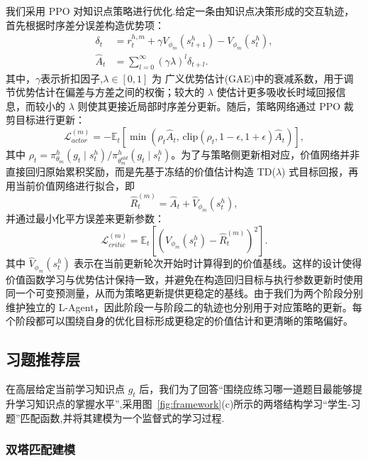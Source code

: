\documentclass[11pt,a4paper]{article}
\begin{document}
我们采用 PPO 对知识点策略进行优化.给定一条由知识点决策形成的交互轨迹，首先根据时序差分误差构造优势项：
\begin{equation}
\begin{aligned}
\delta_t &= r_t^{h,m}+\gamma V_{\phi_m}(s_{t+1}^h)-V_{\phi_m}(s_t^h),\\
\hat{A}_t &= \sum_{l=0}^{\infty}(\gamma\lambda)^l\delta_{t+l}.
\end{aligned}
\end{equation}
其中，$\gamma$表示折扣因子,$\lambda\in[0,1]$ 为 广义优势估计(GAE)中的衰减系数，用于调节优势估计在偏差与方差之间的权衡；较大的 $\lambda$ 使估计更多吸收长时域回报信息，而较小的 $\lambda$ 则使其更接近局部时序差分更新。随后，策略网络通过 PPO 裁剪目标进行更新：
\begin{equation}
\mathcal{L}_{actor}^{(m)}
=
-\mathbb{E}_t
\left[
\min\left(
\rho_t\hat{A}_t,\,
\mathrm{clip}(\rho_t,1-\epsilon,1+\epsilon)\hat{A}_t
\right)
\right],
\end{equation}
其中 $\rho_t=\pi_{\theta_m}^h(g_t\mid s_t^h)/\pi_{\theta_m^{old}}^h(g_t\mid s_t^h)$。为了与策略侧更新相对应，价值网络并非直接回归原始累积奖励，而是先基于冻结的价值估计构造 TD($\lambda$) 式目标回报，再用当前价值网络进行拟合，即
\begin{equation}
\hat{R}_t^{(m)}=\hat{A}_t+\hat{V}_{\phi_m}(s_t^h),
\end{equation}
并通过最小化平方误差来更新参数：
\begin{equation}
\mathcal{L}_{critic}^{(m)}
=
\mathbb{E}_t\left[
\left(
V_{\phi_m}(s_t^h)-\hat{R}_t^{(m)}
\right)^2
\right].
\end{equation}
其中 $\hat{V}_{\phi_m}(s_t^h)$ 表示在当前更新轮次开始时计算得到的价值基线。这样的设计使得价值函数学习与优势估计保持一致，并避免在构造回归目标与执行参数更新时使用同一个可变预测量，从而为策略更新提供更稳定的基线。由于我们为两个阶段分别维护独立的 L-Agent，因此阶段一与阶段二的轨迹也分别用于对应策略的更新。每个阶段都可以围绕自身的优化目标形成更稳定的价值估计和更清晰的策略偏好。
\subsection{习题推荐层}
在高层给定当前学习知识点 $g_t$ 后，我们为了回答“围绕应练习哪一道题目最能够提升学习知识点的掌握水平”,采用图~\ref{fig:framework}(c)所示的两塔结构学习“学生-习题”匹配函数,并将其建模为一个监督式的学习过程.

\subsubsection{双塔匹配建模}
\end{document}
